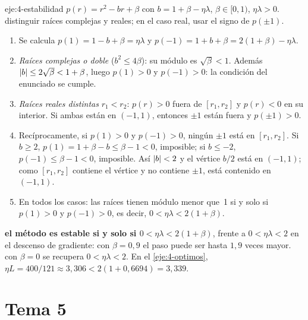 \begin{solucion}{eje:4-estabilidad}
\datos $p(r)=r^{2}-br+\beta$ con $b=1+\beta-\eta\lambda$, $\beta\in[0,1)$, $\eta\lambda>0$.
\planteamiento distinguir raíces complejas y reales; en el caso real, usar el signo de $p(\pm 1)$.
\pasos
\begin{enumerate}[label=\arabic*.]
  \item Se calcula $p(1)=1-b+\beta=\eta\lambda$ y $p(-1)=1+b+\beta=2(1+\beta)-\eta\lambda$.
  \item \emph{Raíces complejas o doble} ($b^{2}\le 4\beta$): su módulo es $\sqrt\beta<1$. Además $\lvert b\rvert\le 2\sqrt\beta<1+\beta$, luego $p(1)>0$ y $p(-1)>0$: la condición del enunciado se cumple.
  \item \emph{Raíces reales distintas} $r_1<r_2$: $p(r)>0$ fuera de $[r_1,r_2]$ y $p(r)<0$ en su interior. Si ambas están en $(-1,1)$, entonces $\pm 1$ están fuera y $p(\pm 1)>0$.
  \item Recíprocamente, si $p(1)>0$ y $p(-1)>0$, ningún $\pm 1$ está en $[r_1,r_2]$. Si $b\ge 2$, $p(1)=1+\beta-b\le\beta-1<0$, imposible; si $b\le-2$, $p(-1)\le\beta-1<0$, imposible. Así $\lvert b\rvert<2$ y el vértice $b/2$ está en $(-1,1)$; como $[r_1,r_2]$ contiene el vértice y no contiene $\pm 1$, está contenido en $(-1,1)$.
  \item En todos los casos: las raíces tienen módulo menor que~1 si y solo si $p(1)>0$ y $p(-1)>0$, es decir, $0<\eta\lambda<2(1+\beta)$.
\end{enumerate}
\resultado \textbf{el método es estable si y solo si $0<\eta\lambda<2(1+\beta)$}, frente a $0<\eta\lambda<2$ en el descenso de gradiente: con $\beta=0{,}9$ el paso puede ser hasta $1{,}9$ veces mayor.
\comprobacion con $\beta=0$ se recupera $0<\eta\lambda<2$. En el \cref{eje:4-optimos}, $\eta L=400/121\approx 3{,}306<2(1+0{,}6694)=3{,}339$.
\end{solucion}

\section{Tema 5}

